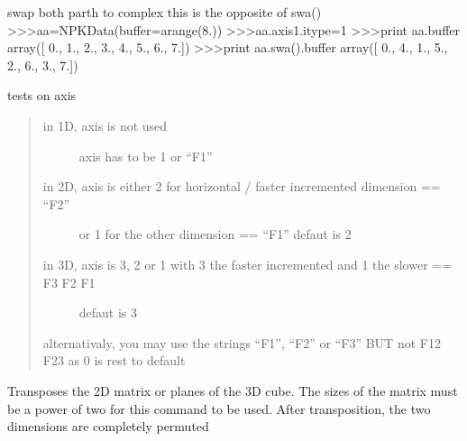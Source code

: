 \documentclass[letterpaper,10pt,openany,oneside]{sphinxmanual}
\begin{document}
\begin{fulllineitems}
\begin{fulllineitems}
\end{fulllineitems}


\begin{fulllineitems}
\label{rst/code:NPKData.NPKData.swap}
swap both parth to complex
this is the opposite of swa()
\textgreater{}\textgreater{}\textgreater{}aa=NPKData(buffer=arange(8.))
\textgreater{}\textgreater{}\textgreater{}aa.axis1.itype=1
\textgreater{}\textgreater{}\textgreater{}print aa.buffer
array({[} 0.,  1.,  2.,  3.,  4.,  5.,  6.,  7.{]})
\textgreater{}\textgreater{}\textgreater{}print aa.swa().buffer
array({[} 0.,  4.,  1.,  5.,  2.,  6.,  3.,  7.{]})

\end{fulllineitems}


\begin{fulllineitems}
\label{rst/code:NPKData.NPKData.test_axis}
tests on axis
\begin{quote}
\begin{description}
\item[{in 1D,  axis is not used}] \leavevmode
axis has to be 1 or ``F1''

\item[{in 2D,  axis is either 2 for horizontal / faster incremented dimension  == ``F2''}] \leavevmode
or 1 for the other dimension == ``F1''
defaut is 2

\item[{in 3D, axis is 3, 2 or 1 with 3 the faster incremented and 1 the slower == F3 F2 F1}] \leavevmode
defaut is 3

\end{description}

alternativaly, you may use the strings ``F1'', ``F2'' or ``F3''
BUT not F12 F23 as 
0 is rest to default
\end{quote}

\end{fulllineitems}


\begin{fulllineitems}
\label{rst/code:NPKData.NPKData.transpose}
Transposes the 2D matrix or planes of the 3D cube. The sizes of 
the matrix must be a power of two for this command to be used. After 
transposition, the two dimensions are completely permuted


\end{fulllineitems}
\end{fulllineitems}
\end{document}
